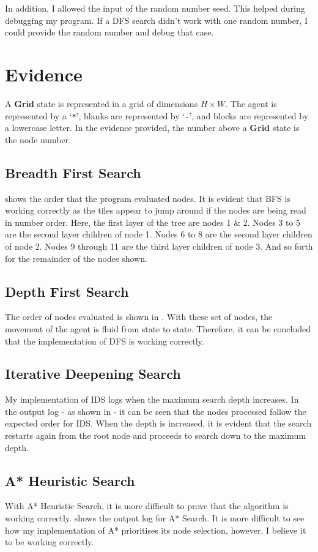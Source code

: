 \documentclass[a4paper]{article}
\def \grid {\textbf{Grid}}
\begin{document}
In addition, I allowed the input of the random number seed.
This helped during debugging my program.
If a DFS search didn't work with one random number, I could provide the random number and debug that case.

\section{Evidence}
A {\grid} state is represented in a grid of dimensions $H \times W$.
The agent is represented by a `\texttt{*}', blanks are represented by `\texttt{-}', and blocks are represented by a lowercase letter.
In the evidence provided, the number above a {\grid} state is the node number.

\subsection{Breadth First Search}
 shows the order that the program evaluated nodes.
It is evident that BFS is working correctly as the tiles appear to jump around if the nodes are being read in number order.
Here, the first layer of the tree are nodes 1 \& 2.
Nodes 3 to 5 are the second layer children of node 1.
Nodes 6 to 8 are the second layer children of node 2.
Nodes 9 through 11 are the third layer children of node 3.
And so forth for the remainder of the nodes shown.

\subsection{Depth First Search}
The order of nodes evaluated is shown in .
With these set of nodes, the movement of the agent is fluid from state to state.
Therefore, it can be concluded that the implementation of DFS is working correctly.

\subsection{Iterative Deepening Search}
My implementation of IDS logs when the maximum search depth increases.
In the output log - as shown in  - it can be seen that the nodes processed follow the expected order for IDS.
When the depth is increased, it is evident that the search restarts again from the root node and proceeds to search down to the maximum depth.

\subsection{A* Heuristic Search}
With A* Heuristic Search, it is more difficult to prove that the algorithm is working correctly.
 shows the output log for A* Search.
It is more difficult to see how my implementation of A* prioritises its node selection, however, I believe it to be working correctly.
\end{document}
